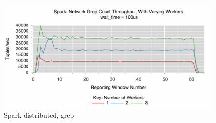 \begin{figure}[t]
\centering
\includegraphics[width=1\linewidth]{figures/spark-grep-dist.pdf}
\caption{Spark distributed, grep}
\label{fig:label-me-if-you-want}
\end{figure}




